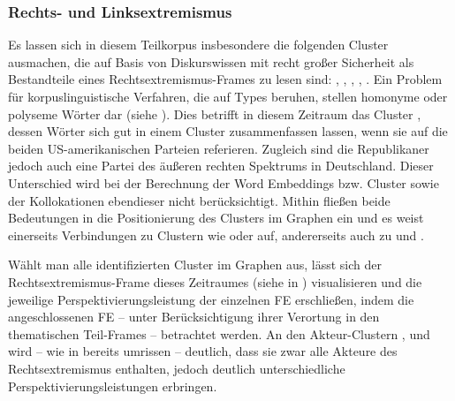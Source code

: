 \subsubsection{Rechts- und Linksextremismus}\label{rechts--und-linksextremismus}

Es lassen sich in diesem Teilkorpus insbesondere die folgenden Cluster ausmachen, die auf Basis von Diskurswissen mit recht großer Sicherheit als Bestandteile eines Rechtsextremismus-Frames zu lesen sind: , , , , . Ein Problem für korpuslinguistische Verfahren, die auf Types beruhen, stellen homonyme oder polyseme Wörter dar (siehe ). Dies betrifft in diesem Zeitraum das Cluster , dessen Wörter sich gut in einem Cluster zusammenfassen lassen, wenn sie auf die beiden US-amerikanischen Parteien referieren. Zugleich sind die Republikaner jedoch auch eine Partei des äußeren rechten Spektrums in Deutschland. Dieser Unterschied wird bei der Berechnung der Word Embeddings bzw. Cluster sowie der Kollokationen ebendieser nicht berücksichtigt. Mithin fließen beide Bedeutungen in die Positionierung des Clusters im Graphen ein und es weist einerseits Verbindungen zu Clustern wie  oder  auf, andererseits auch zu  und .

Wählt man alle identifizierten Cluster im Graphen aus, lässt sich der Recht\-sextremismus-Frame dieses Zeitraumes (siehe  in ) visualisieren und die jeweilige Perspektivierungsleistung der einzelnen FE erschließen, indem die angeschlossenen FE -- unter Berücksichtigung ihrer Verortung in den thematischen Teil-Frames -- betrachtet werden. An den Akteur-Clustern ,  und  wird -- wie in  bereits umrissen -- deutlich, dass sie zwar alle Akteure des Rechtsextremismus enthalten, jedoch deutlich unterschiedliche Perspektivierungsleistungen erbringen.

